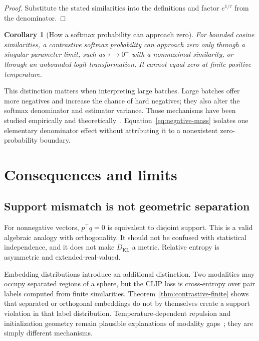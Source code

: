 \documentclass[11pt,a4paper]{article}
\newtheorem{corollary}[theorem]{Corollary}
\theoremstyle{definition}
\theoremstyle{remark}
\newcommand{\KL}{D_{\mathrm{KL}}}
\begin{document}
\begin{proof}
Substitute the stated similarities into the definitions and factor $e^{1/\tau}$ from the denominator.
\end{proof}

\begin{corollary}[How a softmax probability can approach zero]
\label{cor:zero-limit}
For bounded cosine similarities, a contrastive softmax probability can approach zero only through a singular parameter limit, such as $\tau\to0^+$ with a nonmaximal similarity, or through an unbounded logit transformation.
It cannot equal zero at finite positive temperature.
\end{corollary}

This distinction matters when interpreting large batches.
Large batches offer more negatives and increase the chance of hard negatives; they also alter the softmax denominator and estimator variance.
Those mechanisms have been studied empirically and theoretically~\cite{chen2020simclr,ash2022negatives,huang2023modelaware,koromilas2024bridging}.
Equation~\eqref{eq:negative-mass} isolates one elementary denominator effect without attributing it to a nonexistent zero-probability boundary.

\section{Consequences and limits}
\label{sec:discussion}

\subsection{Support mismatch is not geometric separation}

For nonnegative vectors, $p^\top q=0$ is equivalent to disjoint support.
This is a valid algebraic analogy with orthogonality.
It should not be confused with statistical independence, and it does not make $\KL$ a metric.
Relative entropy is asymmetric and extended-real-valued.

Embedding distributions introduce an additional distinction.
Two modalities may occupy separated regions of a sphere, but the CLIP loss is cross-entropy over pair labels computed from finite similarities.
Theorem~\ref{thm:contrastive-finite} shows that separated or orthogonal embeddings do not by themselves create a support violation in that label distribution.
Temperature-dependent repulsion and initialization geometry remain plausible explanations of modality gaps~\cite{liang2022modality,mager2026modality}; they are simply different mechanisms.
\end{document}
